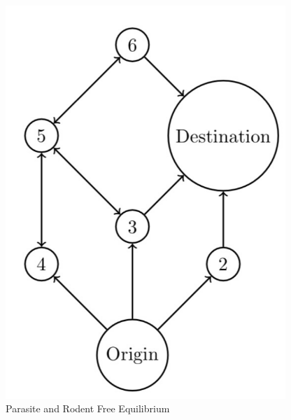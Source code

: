 \documentclass[
  letterpaper,
  DIV=11,
  numbers=noendperiod]{scrartcl}
\begin{document}
\begin{figure}[H]

{\centering \includegraphics[width=4.16667in,height=\textheight]{images/fox_dest.png}

}

\caption{Parasite and Rodent Free Equilibrium}

\end{figure}%
\end{document}
